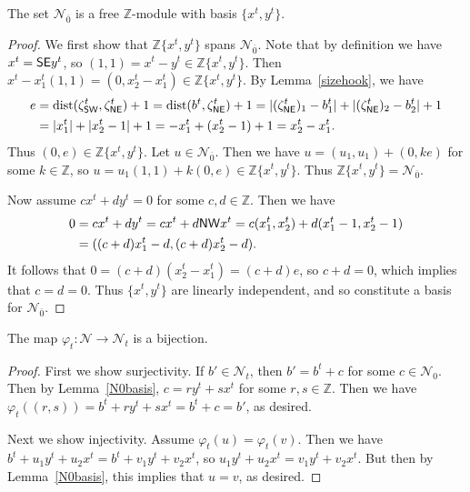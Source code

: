 \documentclass[Unicode,ALCO]{cedram}
\newcommand{\Z}{\mathbb{Z}}
\newcommand{\N}{\mathcal{N}}
\newcommand{\0}{{\bar 0}}
\def\phi{{\varphi}}
\newcommand{\dist}{{\mathrm {dist}}}
\newcommand{\ZZ}{{\mathbb Z}}
\newcommand{\nnee}{{\sf NE}}
\newcommand{\nnww}{{\sf NW}}
\newcommand{\ssee}{{\sf SE}}
\newcommand{\ssww}{{\sf SW}}
\begin{document}
\begin{lemma}\label{N0basis}
The set \(\N_{\overline 0}\) is a free \(\Z\)-module with basis \(\{x^t,y^t\}\).
\end{lemma}
\begin{proof}
We first show that \(\ZZ\{x^t,y^t\}\) spans \(\N_{\overline 0}\). Note that by definition we have \(x^t = \ssee y^t\), so \((1,1) = x^t-y^t \in \ZZ\{x^t,y^t\}\). Then \(x^t - x^t_1(1,1) = (0,x^t_2-x^t_1) \in \ZZ\{x^t,y^t\}\).
By Lemma~\ref{sizehook}, we have
\begin{align*}
e&= \dist(\zeta^{t}_{\ssww}, \zeta^{t}_{\nnee}) + 1 
=\dist(b^t, \zeta^{t}_{\nnee}) + 1
 =|(\zeta^{t}_{\nnee})_1 - b^t_1| + |(\zeta^{t}_{\nnee})_2 - b^t_2| + 1\\
 &=|x^t_1| + |x^t_2-1| + 1 = -x^t_1 + (x^t_2-1) + 1 = x^t_2 - x^t_1.
\end{align*}
Thus \((0,e) \in \ZZ\{x^t,y^t\}\). Let \(u \in \N_{\overline 0}\). Then we have \(u = (u_1,u_1) + (0,ke)\) for some \(k \in \ZZ\), so \(u = u_1(1,1) + k(0,e) \in \ZZ\{x^t,y^t\}\). Thus \(\ZZ\{x^t,y^t\} = \N_{\overline 0}\).

Now assume \(cx^t + dy^t = 0\) for some \(c,d \in \ZZ\). Then we have
\begin{align*}
0 &=cx^t + dy^t = c x^t+ d\nnww x^t = c(x^t_1,x^t_2) + d(x^t_1-1,x^t_2-1)\\
&= ((c+d)x^t_1 - d, (c+d)x^t_2 - d).
\end{align*}
It follows that \(0 = (c+d)(x^t_2-x^t_1) = (c+d)e\), so \(c+ d = 0\), which implies that \(c=d=0\). Thus \(\{x^t,y^t\}\) are linearly independent, and so constitute a basis for \(\N_{\overline 0}\).
\end{proof}

\begin{lemma}\label{phibij}
The map \(\phi_t: \N \to \N_t\) is a bijection.
\end{lemma}
\begin{proof}
First we show surjectivity. If \(b' \in \N_t\), then \(b' = b^t+c\) for some \(c \in \N_0\). Then by Lemma~\ref{N0basis}, \(c = ry^t + sx^t\) for some \(r,s \in \ZZ\). Then we have \(\phi_t((r,s)) = b^t + ry^t + sx^t = b^t+c = b'\), as desired.

Next we show injectivity. Assume \(\phi_t(u) = \phi_t(v)\). Then we have \(b^t+u_1y^t + u_2x^t = b^t+ v_1y^t + v_2x^t\), so \(u_1y^t + u_2x^t = v_1y^t + v_2x^t\). But then by Lemma~\ref{N0basis}, this implies that \(u = v\), as desired.
\end{proof}
\end{document}

